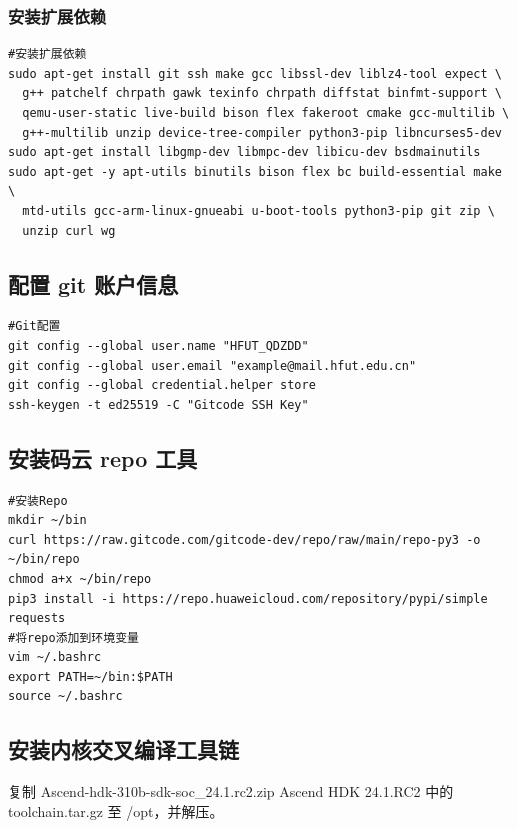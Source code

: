 \subsubsection{安装扩展依赖}

\begin{lstlisting}[style=shell, caption={安装扩展依赖}]
#安装扩展依赖
sudo apt-get install git ssh make gcc libssl-dev liblz4-tool expect \
  g++ patchelf chrpath gawk texinfo chrpath diffstat binfmt-support \
  qemu-user-static live-build bison flex fakeroot cmake gcc-multilib \
  g++-multilib unzip device-tree-compiler python3-pip libncurses5-dev
sudo apt-get install libgmp-dev libmpc-dev libicu-dev bsdmainutils
sudo apt-get -y apt-utils binutils bison flex bc build-essential make \
  mtd-utils gcc-arm-linux-gnueabi u-boot-tools python3-pip git zip \
  unzip curl wg
\end{lstlisting}

\subsection{配置 git 账户信息}

\begin{lstlisting}[style=shell, caption={Git 配置}]
#Git配置
git config --global user.name "HFUT_QDZDD"
git config --global user.email "example@mail.hfut.edu.cn"
git config --global credential.helper store
ssh-keygen -t ed25519 -C "Gitcode SSH Key"
\end{lstlisting}

\subsection{安装码云 repo 工具}

\begin{lstlisting}[style=shell, caption={安装 Repo}]
#安装Repo
mkdir ~/bin
curl https://raw.gitcode.com/gitcode-dev/repo/raw/main/repo-py3 -o ~/bin/repo
chmod a+x ~/bin/repo
pip3 install -i https://repo.huaweicloud.com/repository/pypi/simple requests
#将repo添加到环境变量
vim ~/.bashrc
export PATH=~/bin:$PATH
source ~/.bashrc
\end{lstlisting}

\subsection{安装内核交叉编译工具链}

复制 Ascend-hdk-310b-sdk-soc\_24.1.rc2.zip Ascend HDK 24.1.RC2 中的 toolchain.tar.gz 至 /opt，并解压。

